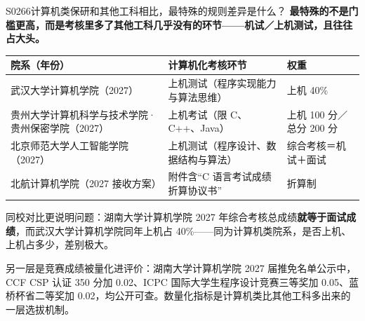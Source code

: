 \begin{qa}{S0266}{计算机类保研和其他工科相比，最特殊的规则差异是什么？}
\textbf{最特殊的不是门槛更高，而是考核里多了其他工科几乎没有的环节——机试／上机测试，且往往占大头。}

\par\vspace{2pt}\nobreak\begin{center}\footnotesize
\begin{tabularx}{\textwidth}{>{\raggedright\arraybackslash}X>{\raggedright\arraybackslash}X>{\raggedright\arraybackslash}X}
\toprule
\textbf{院系（年份）} & \textbf{计算机化考核环节} & \textbf{权重} \\ \midrule
武汉大学计算机学院（2027） & 上机测试（程序实现能力与算法思维） & 上机 40\% \\
贵州大学计算机科学与技术学院·贵州保密学院（2027） & 上机考试（限 C、C++、Java） & 上机 100 分／总分 200 分 \\
北京师范大学人工智能学院（2027） & 上机测试（程序设计、数据结构与算法） & 综合考核＝机试＋面试 \\
北航计算机学院（2027 接收方案） & 附件含“C 语言考试成绩折算协议书” & 折算制 \\
\bottomrule
\end{tabularx}
\end{center}\vspace{2pt}\par

同校对比更说明问题：湖南大学计算机学院 2027 年综合考核总成绩\textbf{就等于面试成绩}，而武汉大学计算机学院同年上机占 40\%——同为计算机类院系，是否上机、上机占多少，差别极大。

另一层是竞赛成绩被量化进评价：湖南大学计算机学院 2027 届推免名单公示中，CCF CSP 认证 350 分加 0.02、ICPC 国际大学生程序设计竞赛三等奖加 0.05、蓝桥杯省二等奖加 0.02，均公开可查。数量化指标是计算机类比其他工科多出来的一层选拔机制。
\end{qa}

